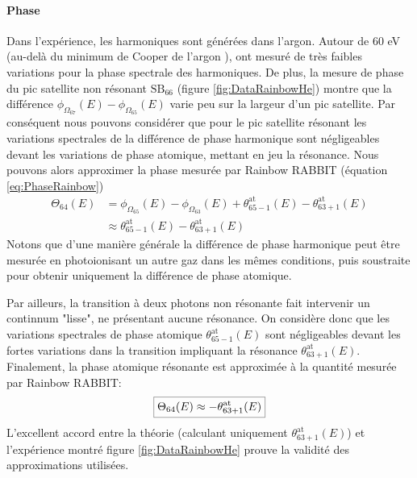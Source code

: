 \paragraph*{Phase} Dans l'expérience, les harmoniques sont générées dans l'argon. Autour de 60 eV (au-delà du minimum de Cooper de l'argon ),  ont mesuré de très faibles variations pour la phase spectrale des harmoniques. De plus, la mesure de phase du pic satellite non résonant $\text{SB}_{66}$ (figure \ref{fig:DataRainbowHe}) montre que la différence $\phi_{\Omega_{67}}(E) - \phi_{\Omega_{65}}(E)$ varie peu sur la largeur d'un pic satellite. Par conséquent nous pouvons considérer que pour le pic satellite résonant les variations spectrales de la différence de phase harmonique sont négligeables devant les variations de phase atomique, mettant en jeu la résonance. Nous pouvons alors approximer la phase mesurée par Rainbow RABBIT (équation \ref{eq:PhaseRainbow})
\begin{align}
\Theta_{64} (E) & = \phi_{\Omega_{65}}(E) - \phi_{\Omega_{63}}(E) + \theta^{\text{at}}_{65-1}(E) - \theta^{\text{at}}_{63+1}(E) \\
& \approx \theta^{\text{at}}_{65-1}(E) - \theta^{\text{at}}_{63+1}(E)
\end{align}
Notons que d'une manière générale la différence de phase harmonique peut être mesurée en photoionisant un autre gaz dans les mêmes conditions, puis soustraite pour obtenir uniquement la différence de phase atomique. 

Par ailleurs, la transition à deux photons non résonante fait intervenir un continnum "lisse", ne présentant aucune résonance. On considère donc que les variations spectrales de phase atomique $\theta^{\text{at}}_{65-1}(E)$ sont négligeables devant les fortes variations dans la transition impliquant la résonance $\theta^{\text{at}}_{63+1}(E)$. Finalement, la phase atomique résonante est approximée à la quantité mesurée par Rainbow RABBIT:
\begin{equation}
\setlength\fboxrule{0.25pt}
\boxed{
\Theta_{64} (E) \approx - \theta^{\text{at}}_{63+1}(E)
}
\end{equation}
L'excellent accord entre la théorie (calculant uniquement $\theta^{\text{at}}_{63+1}(E)$) et l'expérience montré figure \ref{fig:DataRainbowHe} prouve la validité des approximations utilisées.


